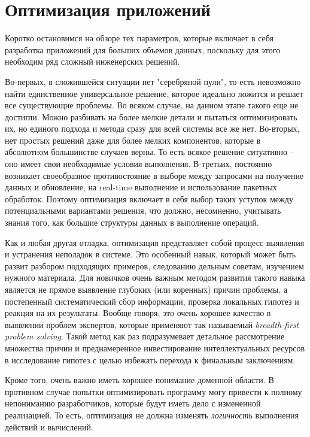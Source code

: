 \section{Оптимизация приложений \LB}
\label{sec:optimization}

Коротко остановимся на обзоре тех параметров, которые включает в себя разработка приложений для больших объемов данных, поскольку для этого необходим ряд сложный инженерских решений.

Во-первых, в сложившейся ситуации нет "серебряной пули", то есть невозможно найти единственное универсальное решение, которое идеально ложится и решает все существующие проблемы. Во всяком случае, на данном этапе такого еще не достигли. Можно разбивать на более мелкие детали и пытаться оптимизировать их, но единого подхода и метода сразу для всей системы все же нет. Во-вторых, нет простых решений даже для более мелких компонентов, которые в абсолютном большинстве случаев верны. То есть всякое решение ситуативно – оно имеет свои необходимые условия выполнения. В-третьих, постоянно возникает своеобразное противостояние в выборе между запросами на получение данных и обновление, на real-time выполнение и использование пакетных обработок. Поэтому оптимизация включает в себя выбор таких уступок между потенциальными вариантами решения, что должно, несомненно, учитывать знания того, как \logiql большие структуры данных в выполнение операций.

Как и любая другая отладка, оптимизация представляет собой процесс выявления и устранения неполадок в системе. Это особенный навык, который может быть развит разбором подходящих примеров, следованию дельным советам, изучением нужного материала. Для новичков очень важным методом развития такого навыка является не прямое выявление глубоких (или коренных) причин проблемы, а постепенный систематический сбор информации, проверка локальных гипотез и реакция на их результаты. Вообще говоря, это очень хорошее качество в выявлении проблем экспертов, которые применяют так называемый \emph{breadth-first problem solving}. Такой метод как раз подразумевает детальное рассмотрение множества причин и преднамеренное инвестирование интеллектуальных ресурсов в исследование гипотез с целью избежать перехода к финальным заключениям.

Кроме того, очень важно иметь хорошее понимание доменной области. В противном случае попытки оптимизировать программу могу привести к полному непониманию разработчиков, которые будут иметь дело с измененной реализацией. То есть, оптимизация не должна изменять \emph{логичность} выполнения действий и вычислений.












